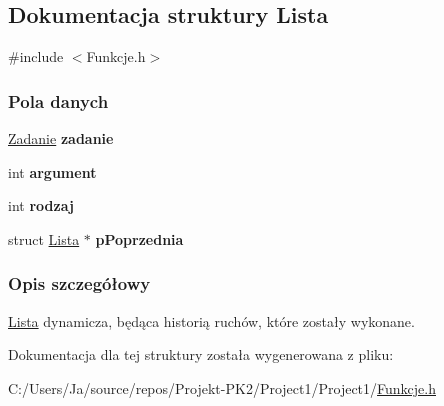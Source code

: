 \hypertarget{structLista}{}\subsection{Dokumentacja struktury Lista}
\label{structLista}


{\ttfamily \#include $<$Funkcje.\+h$>$}

\subsubsection*{Pola danych}
\begin{DoxyCompactItemize}
\item 
\mbox{\label{structLista_a53bab83cac09491f005668240f29a948}} 
\mbox{\hyperlink{Funkcje_8h_a8f8e0d34a9d3b508b7290a6300dbae08}{Zadanie}} {\bfseries zadanie}
\item 
\mbox{\label{structLista_a1a145408095bf9c45f5ce9625b5864eb}} 
int {\bfseries argument}
\item 
\mbox{\label{structLista_a1ac3ddfd089d5f35f90698b863699a65}} 
int {\bfseries rodzaj}
\item 
\mbox{\label{structLista_aa8224306b31dc945379a776c5bc308b3}} 
struct \mbox{\hyperlink{structLista}{Lista}} $\ast$ {\bfseries p\+Poprzednia}
\end{DoxyCompactItemize}


\subsubsection{Opis szczegółowy}
\mbox{\hyperlink{structLista}{Lista}} dynamicza, będąca historią ruchów, które zostały wykonane. 

Dokumentacja dla tej struktury została wygenerowana z pliku\+:\begin{DoxyCompactItemize}
\item 
C\+:/\+Users/\+Ja/source/repos/\+Projekt-\/\+P\+K2/\+Project1/\+Project1/\mbox{\hyperlink{Funkcje_8h}{Funkcje.\+h}}\end{DoxyCompactItemize}
